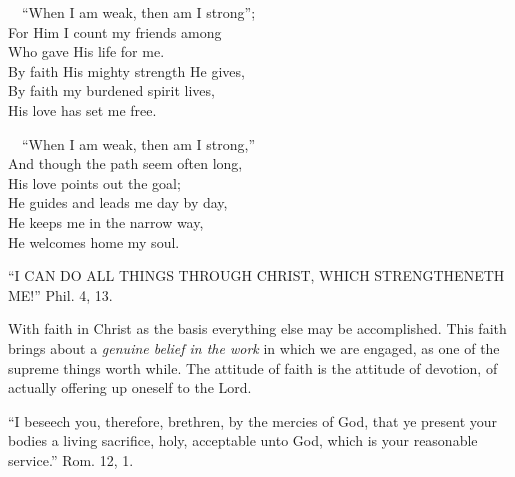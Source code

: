 \documentclass[
]{book}
\begin{document}
~~``When I am weak, then am I strong'';\\
\hspace*{0.333em}\hspace*{0.333em}For Him I count my friends among\\
\hspace*{0.333em}\hspace*{0.333em}Who gave His life for me.\\
\hspace*{0.333em}\hspace*{0.333em}By faith His mighty strength He gives,\\
\hspace*{0.333em}\hspace*{0.333em}By faith my burdened spirit lives,\\
\hspace*{0.333em}\hspace*{0.333em}His love has set me free.

~~``When I am weak, then am I strong,''\\
\hspace*{0.333em}\hspace*{0.333em}And though the path seem often long,\\
\hspace*{0.333em}\hspace*{0.333em}His love points out the goal;\\
\hspace*{0.333em}\hspace*{0.333em}He guides and leads me day by day,\\
\hspace*{0.333em}\hspace*{0.333em}He keeps me in the narrow way,\\
\hspace*{0.333em}\hspace*{0.333em}He welcomes home my soul.

``I CAN DO ALL THINGS THROUGH CHRIST, WHICH STRENGTHENETH ME!'' Phil. 4, 13.

With faith in Christ as the basis everything else may be accomplished. This faith brings about a \emph{genuine belief in the work} in which we are engaged, as one of the supreme things worth while. The attitude of faith is the attitude of devotion, of actually offering up oneself to the Lord.

``I beseech you, therefore, brethren, by the mercies of God, that ye present your bodies a living sacrifice, holy, acceptable unto God, which is your reasonable service.'' Rom. 12, 1.
\end{document}
